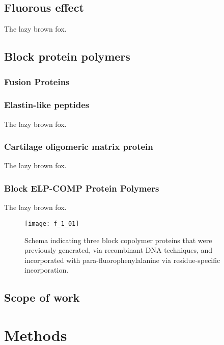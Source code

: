 \subsection{Fluorous effect}

The lazy brown fox.

\subsection{Block protein polymers}

\subsubsection{Fusion Proteins}

\subsubsection{Elastin-like peptides}

The lazy brown fox.

\subsubsection{Cartilage oligomeric matrix protein}

The lazy brown fox.

\subsubsection{Block ELP-COMP Protein Polymers}

The lazy brown fox.

\begin{figure}[h]
    \centering
    \texttt{[image: f\_1\_01]}
    \caption{Schema indicating three block copolymer proteins that were
        previously generated, via recombinant DNA techniques, and incorporated
    with para-fluorophenylalanine via residue-specific incorporation.
    }
    \label{fig:pff_proteins}
\end{figure}

\subsection{Scope of work}

\section{Methods}

